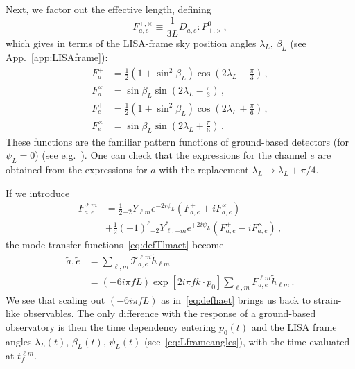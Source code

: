 \documentclass[aps,showpacs,twocolumn,prd,superscriptaddress,nofootinbib]{revtex4-1}
\newcommand{\be}{\begin{equation}}
\newcommand{\ee}{\end{equation}}
\newcommand{\bsub}{\begin{subequations}}
\newcommand{\esub}{\end{subequations}}
\newcommand\calT{{\mathcal{T}}}
\newcommand{\nn}{\nonumber}
\newcommand\betaL{{\beta_{L}}}
\newcommand\lambdaL{{\lambda_{L}}}
\newcommand{\sYlm}{{}_{-2}Y_{\ell m}}
\newcommand{\sYlminusmstar}{{}_{-2}Y_{\ell, -m}^{*}}
\begin{document}
Next, we factor out the effective length, defining
\be\label{eq:defFapcFepc}
	F_{a,e}^{+,\times} \equiv \frac{1}{3L} D_{a,e} : P_{+,\times}^{0} \,,
\ee
which gives in terms of the LISA-frame sky position angles $\lambdaL$, $\betaL$ (see App.~\ref{app:LISAframe}):
\bsub\label{eq:FapcFepc}
\begin{align}
	F_{a}^{+} &= \frac{1}{2} \left( 1 + \sin^{2}\beta_{L} \right) \cos \left(2\lambda_{L} - \frac{\pi}{3} \right) \,,\\
	F_{a}^{\times} &= \sin\beta_{L} \sin \left(2\lambda_{L} - \frac{\pi}{3} \right) \,,\\
	F_{e}^{+} &= \frac{1}{2} \left( 1 + \sin^{2}\beta_{L} \right) \cos \left(2\lambda_{L} + \frac{\pi}{6} \right) \,,\\
	F_{e}^{\times} &= \sin\beta_{L} \sin \left(2\lambda_{L} + \frac{\pi}{6} \right)  \,.
\end{align}
\esub
These functions are the familiar pattern functions of ground-based detectors (for $\psi_{L}=0$) (see e.g.~\cite{FlanaganHughes05}).
One can check that the expressions for the channel $e$ are obtained from the expressions for $a$ with the replacement $\lambdaL \rightarrow \lambdaL + \pi/4$.

If we introduce
\begin{align}\label{eq:Flmae}
	F_{a,e}^{\ell m} &= \frac{1}{2} \sYlm e^{-2 i \psi_{L}} \left( F_{a,e}^{+} + i F_{a,e}^{\times}\right) \nn\\
	& + \frac{1}{2} (-1)^{\ell} \sYlminusmstar e^{+2 i \psi_{L}} \left( F_{a,e}^{+} - i F_{a,e}^{\times} \right) \,,
\end{align}
the mode transfer functions~\eqref{eq:defTlmaet} become
\begin{align}\label{eq:transferlowfae}
	\tilde{a}, \tilde{e} &= \sum_{\ell,m} \calT^{\ell m}_{a,e} \tilde{h}_{\ell m} \nn\\
	&= \left(-6 i \pi f L\right) \exp[2i \pi f k\cdot p_{0}] \sum_{\ell,m} F_{a,e}^{\ell m} \tilde{h}_{\ell m}\,.
\end{align}
We see that scaling out $(-6 i \pi fL)$ as in~\eqref{eq:defhaet} brings us back to strain-like observables. The only difference with the response of a ground-based observatory is then the time dependency entering $p_{0}(t)$ and the LISA frame angles $\lambda_{L}(t)$, $\beta_{L}(t)$, $\psi_{L}(t)$ (see~\eqref{eq:Lframeangles}), with the time evaluated at $t_{f}^{\ell m}$.
\end{document}
